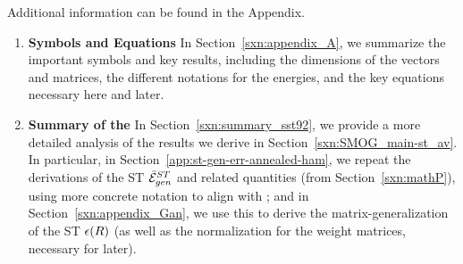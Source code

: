 \noindent
Additional information can be found in the Appendix.
\begin{enumerate}[label=A.\arabic*]
\item
  \textbf{Symbols and Equations}
  In Section~\ref{sxn:appendix_A}, we summarize the important symbols and key results,
         including the dimensions of the vectors and matrices, the different notations for the energies,
         and the key equations necessary here and later.
   \item
   \textbf{Summary of the \SMOG}
         In Section~\ref{sxn:summary_sst92}, we provide a more detailed analysis of the results we derive in Section~\ref{sxn:SMOG_main-st_av}.
         In particular, in Section~\ref{app:st-gen-err-annealed-ham}, we repeat the derivations of the ST \GeneralizationError $\bar{\mathcal{E}}^{ST}_{gen}$ and related quantities (from Section~\ref{sxn:mathP}),
         using more concrete notation to align with \cite{SST90, SST92}; and
         in Section~\ref{sxn:appendix_Gan}, we use this to derive the matrix-generalization of the ST \EffectivePotential $\epsilon(R)$ (as well as the normalization for the weight matrices, necessary for later).
\end{enumerate}





%


